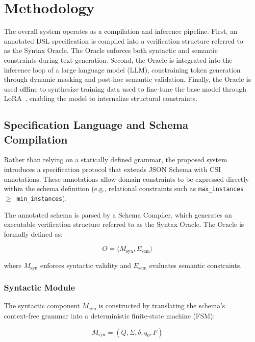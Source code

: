 \section{Methodology}
The overall system operates as a compilation and inference pipeline. First, an 
annotated DSL specification is compiled into a 
verification structure referred to as the Syntax Oracle. The Oracle 
enforces both syntactic and semantic constraints during text generation. Second, 
the Oracle is integrated into the inference loop of a large language model (LLM), 
constraining token generation through dynamic masking and post-hoc semantic 
validation. Finally, the Oracle is used offline to synthesize training data 
used to fine-tune the base model through LoRA~\cite{hu2021lora}, enabling 
the model to internalize structural constraints.

\subsection{Specification Language and Schema Compilation}
Rather than relying on a statically defined grammar, the proposed system 
introduces a specification protocol that extends JSON Schema with 
CSI annotations. These annotations allow 
domain constraints to be expressed directly within the schema definition (e.g., 
relational constraints such as \texttt{max\_instances $\ge$ min\_instances}).

The annotated schema is parsed by a Schema Compiler, which generates an 
executable verification structure referred to as the Syntax Oracle. The Oracle is 
formally defined as:

\begin{equation}
O = \langle M_{\text{syn}}, E_{\text{sem}} \rangle
\end{equation}

where $M_{\text{syn}}$ enforces syntactic validity and $E_{\text{sem}}$ 
evaluates semantic constraints.

\subsubsection{Syntactic Module}
The syntactic component $M_{\text{syn}}$ is constructed by translating the 
schema's context-free grammar into a deterministic finite-state machine (FSM):

\begin{equation}
M_{\text{syn}} = (Q, \Sigma, \delta, q_0, F)
\end{equation}

